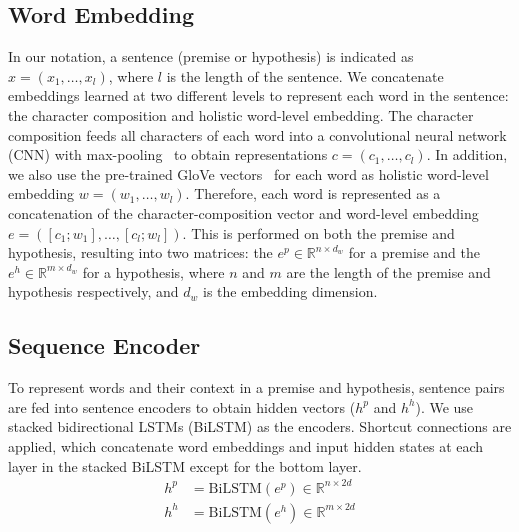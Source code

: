 \documentclass[11pt,letterpaper]{article}
\begin{document}
\subsection{Word Embedding}
In our notation, a sentence (premise or hypothesis) is indicated as $x=(x_1,\dots,x_l)$, where $l$ is the length of the sentence. We concatenate embeddings learned at two different levels to represent each word in the sentence: the character composition and holistic word-level embedding. The character composition feeds all characters of each word into a convolutional neural network (CNN) with max-pooling~\citep{kim2014convolutional} to obtain representations $c = (c_1,\dots,c_l)$. In addition, we also use the pre-trained GloVe vectors~\citep{Pennington:D14-1162} for each word as holistic word-level embedding $w=(w_1,\dots,w_l)$. Therefore, each word is represented as a concatenation of the character-composition vector and word-level embedding $e=([c_1;w_1],\dots,[c_l;w_l])$. This is performed on both the premise and hypothesis, resulting into two matrices: the $e^p \in \mathbb{R} ^{n \times d_w}$ for a premise and the $e^h \in \mathbb{R} ^{m \times d_w}$ for a hypothesis, where $n$ and $m$ are the length of the premise and hypothesis respectively, and $d_w$ is the embedding dimension.

\subsection{Sequence Encoder}
To represent words and their context in a premise and hypothesis, sentence pairs are fed into sentence encoders to obtain hidden vectors ($h^p$ and $h^h$). We use stacked bidirectional LSTMs (BiLSTM) as the encoders. Shortcut connections are applied, which concatenate word embeddings and input hidden states at each layer in the stacked BiLSTM except for the bottom layer.
\begin{align}
h^p&=\text{BiLSTM}({e^p}) \in \mathbb{R} ^{n \times 2d} \\
h^h&=\text{BiLSTM}({e^h}) \in \mathbb{R} ^{m \times 2d}
\end{align}
\end{document}
